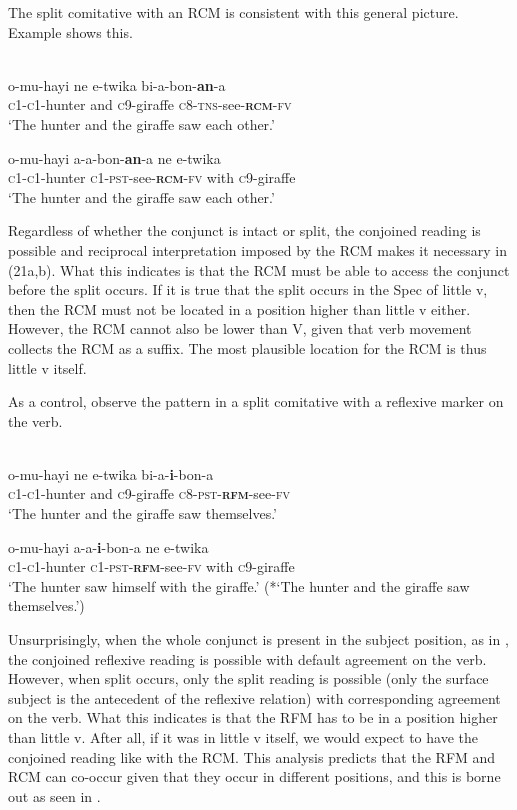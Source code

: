\documentclass[output=paper]{langsci/langscibook}
\begin{document}
  The split comitative with an RCM is consistent with this general picture. Example  shows this.


\ea\label{ex:}
  \\
\ea
\gll  o-mu-hayi   ne   e-twika   bi-a-bon-\textbf{an}-a  \\
       \textsc{c1-c1}-hunter   and   \textsc{c}9-giraffe   \textsc{c8-tns}-see-\textbf{\textsc{rcm}}\textsc{-fv} \\
\glt   ‘The hunter and the giraffe saw each other.’

\ex
\gll   o-mu-hayi     a-a-bon-\textbf{an}-a     ne   e-twika\\
       \textsc{c1-c1}-hunter    \textsc{c1-pst}-see-\textbf{\textsc{rcm}}\textsc{-fv}  with  \textsc{c}9-giraffe   \\
\glt   ‘The hunter and the giraffe saw each other.’
\z
\z

Regardless of whether the conjunct is intact or split, the conjoined reading is possible and reciprocal interpretation imposed by the RCM makes it necessary in (21a,b). What this indicates is that the RCM must be able to access the conjunct before the split occurs. If it is true that the split occurs in the Spec of little v, then the RCM must not be located in a position higher than little v either. However, the RCM cannot also be lower than V, given that verb movement collects the RCM as a suffix. The most plausible location for the RCM is thus little v itself. 

  As a control, observe the pattern in a split comitative with a reflexive marker on the verb. 


\ea\label{ex:}
  \\
\ea
\gll  o-mu-hayi   ne   e-twika   bi-a-\textbf{{i}}{-bon-a}  \\
       \textsc{c1-c1}-hunter   and   \textsc{c}9-giraffe   \textsc{c}8-\textsc{pst-}\textbf{\textsc{rfm}}-see-\textsc{fv} \\
\glt   ‘The hunter and the giraffe saw themselves.’

\ex
\gll  o-mu-hayi   a-a-\textbf{i}-bon-a     ne   e-twika \\
       \textsc{c1-c1}-hunter  \textsc{c}1-\textsc{pst-}\textbf{\textsc{rfm}}-see-\textsc{fv}   with   \textsc{c}9-giraffe \\
\glt   ‘The hunter saw himself with the giraffe.’
\glt   (*‘The hunter and the giraffe saw themselves.’)
\z
\z

Unsurprisingly, when the whole conjunct is present in the subject position, as in , the conjoined reflexive reading is possible with default agreement on the verb. However, when split occurs, only the split reading is possible (only the surface subject is the antecedent of the reflexive relation) with corresponding agreement on the verb. What this indicates is that the RFM has to be in a position higher than little v. After all, if it was in little v itself, we would expect  to have the conjoined reading like with the RCM. This analysis predicts that the RFM and RCM can co-occur given that they occur in different positions, and this is borne out as seen in .
\end{document}

